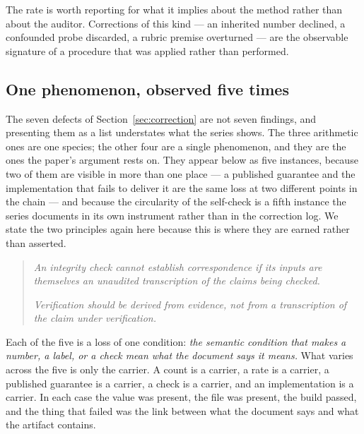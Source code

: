 \documentclass[sigconf,review]{acmart}
\begin{document}
The rate is worth reporting for what it implies about the method rather than
about the auditor. Corrections of this kind --- an inherited number declined, a
confounded probe discarded, a rubric premise overturned --- are the observable
signature of a procedure that was applied rather than performed.

\subsection{One phenomenon, observed five times}
\label{sec:unification}

The seven defects of Section~\ref{sec:correction} are not seven findings, and
presenting them as a list understates what the series shows. The three
arithmetic ones are one species; the other four are a single phenomenon, and
they are the ones the paper's argument rests on. They appear below as five
instances, because two of them are visible in more than one place --- a
published guarantee and the implementation that fails to deliver it are the
same loss at two different points in the chain --- and because the circularity
of the self-check is a fifth instance the series documents in its own
instrument rather than in the correction log. We state the two principles again
here because this is where they are earned rather than asserted.

\begin{quote}
\emph{An integrity check cannot establish correspondence if its inputs are
themselves an unaudited transcription of the claims being checked.}

\emph{Verification should be derived from evidence, not from a transcription of
the claim under verification.}
\end{quote}

Each of the five is a loss of one condition: \emph{the semantic condition that
makes a number, a label, or a check mean what the document says it means.} What
varies across the five is only the carrier. A count is a carrier, a rate is a
carrier, a published guarantee is a carrier, a check is a carrier, and an
implementation is a carrier. In each case the value was present, the file was
present, the build passed, and the thing that failed was the link between what
the document says and what the artifact contains.
\end{document}
